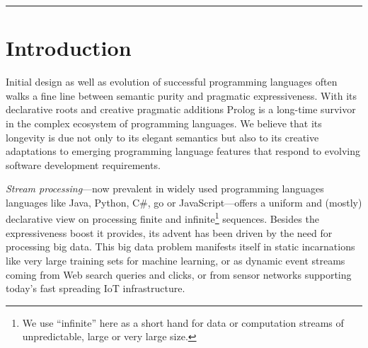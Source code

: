 \documentclass[submission,copyright,creativecommons]{eptcs}
\begin{document}
\begin{comment}
\begin{abstract}
Lazy stream generators provide a unified interface to stateful computations, I/O operations as well as algorithms producing finite or infinite sequences. 

As a special instance, we introduce answer stream generators that 
encapsulate the work of coroutining first-class logic engines and support interoperation between forward recursive {\em AND-streams} and backtracking-generated {\em OR-streams}. 

Stream generators are exposed to the application programmer either through an abstract sequence manipulation API or as lazy lists. We define an algebra of stream generator operations that extends Prolog via an embedded language interpreter providing a compact notation for composition mechanisms and supports moving between isomorphic sequence representations.
\end{abstract}
\end{comment}
\hrule


\section{Introduction}

Initial design as well as evolution of successful programming languages often walks a fine line between semantic purity and pragmatic expressiveness. With its declarative roots and creative pragmatic additions Prolog is a long-time survivor in the complex ecosystem of programming languages. We believe that its longevity is due not only to its elegant semantics but also to its creative adaptations to emerging programming language features that respond to evolving software development requirements.

\emph{Stream processing}---now prevalent in widely used programming languages
languages like Java, Python, C\#, go or JavaScript---offers a uniform and
(mostly) declarative view on processing finite and infinite\footnote{We use
``infinite'' here as a short hand for data or computation streams of
unpredictable, large or very large size.} sequences. Besides the expressiveness
boost it provides, its advent has been driven by the need for processing big
data. This big data problem manifests itself in static incarnations like very
large training sets for machine learning, or as dynamic event streams coming
from Web search queries and clicks, or from sensor networks supporting today's
fast spreading IoT infrastructure. 
\end{document}

